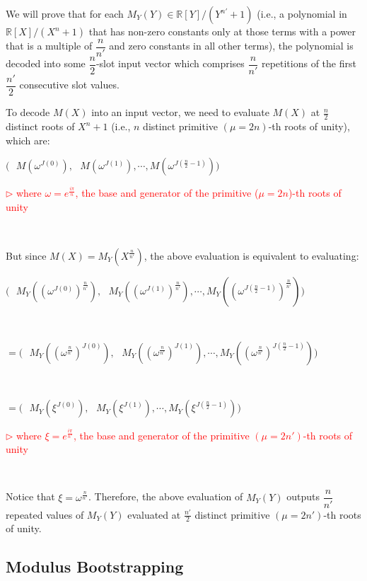 We will prove that for each $M_Y(Y) \in \mathbb{R}[Y] / (Y^{n'} + 1)$ (i.e., a polynomial in $\mathbb{R}[X] / (X^n + 1)$ that has non-zero constants only at those terms with a power that is a multiple of $\dfrac{n}{n'}$ and zero constants in all other terms), the polynomial is decoded into some $\dfrac{n}{2}$-slot input vector which comprises $\dfrac{n}{n'}$ repetitions of the first $\dfrac{n'}{2}$ consecutive slot values. 

To decode $M(X)$ into an input vector, we need to evaluate $M(X)$ at $\frac{n}{2}$ distinct roots of $X^n + 1$ (i.e., $n$ distinct primitive $(\mu=2n)$-th roots of unity), which are: 

$\bm{(} \text{ } 
M(\omega^{J(0)}), \text{ } M(\omega^{J(1)}), \cdots,  M(\omega^{J(\frac{n}{2}-1)})\bm{)}$ 

\textcolor{red}{ $\rhd$ where $\omega=e^{\frac{i\pi}{n}}$, the base and generator of the primitive ($\mu=2n$)-th roots of unity}

$ $

But since $M(X) = M_Y(X^{\frac{n}{n'}})$, the above evaluation is equivalent to evaluating: 

$\bm{(} \text{ } 
M_Y((\omega^{J(0)})^{\frac{n}{n'}}), \text{ } M_Y((\omega^{J(1)})^{\frac{n}{n'}}), \cdots,  M_Y((\omega^{J(\frac{n}{2}-1)})^{\frac{n}{n'}}) \bm{)}$

$ $

$= \bm{(} \text{ } 
M_Y((\omega^{\frac{n}{n'}})^{J(0)}), \text{ } M_Y((\omega^{\frac{n}{n'}})^{J(1)}), \cdots,  M_Y((\omega^{\frac{n}{n'}})^{J(\frac{n}{2}-1)})\bm{)}$

$ $

$= \bm{(} \text{ } 
M_Y(\xi^{J(0)}), \text{ } M_Y(\xi^{J(1)}), \cdots,  M_Y(\xi^{J(\frac{n}{2}-1)})\bm{)}$ 

\textcolor{red}{ $\rhd$ where $\xi = e^{\frac{i\pi}{n'}}$, the base and generator of the primitive $(\mu=2n')$-th roots of unity}

$ $

Notice that $\xi = \omega^{\frac{n}{n'}}$. Therefore, the above evaluation of $M_Y(Y)$ outputs $\dfrac{n}{n'}$ repeated values of $M_Y(Y)$ evaluated at $\frac{n'}{2}$ distinct primitive $(\mu=2n')$-th roots of unity. 



\subsection{Modulus Bootstrapping}
\label{subsec:ckks-bootstrapping}


